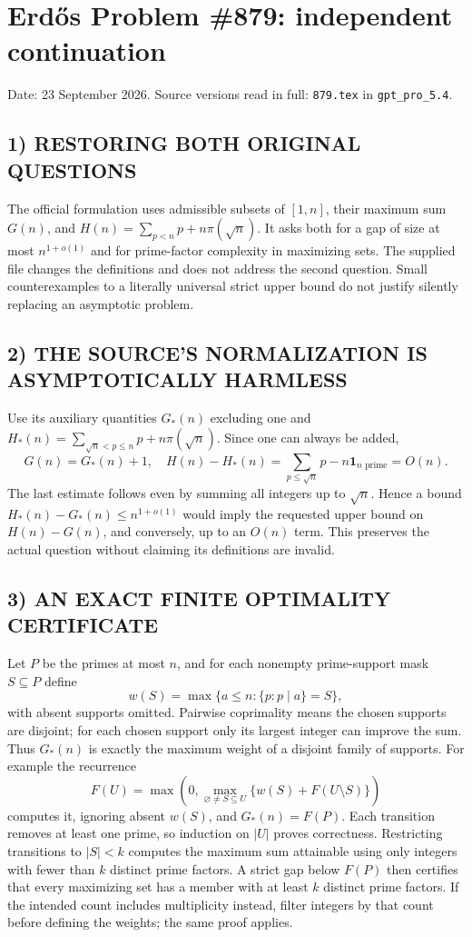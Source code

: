 \section{Erd\H{o}s Problem \#879: independent continuation}
\noindent Date: 23 September 2026. Source versions read in full: \texttt{879.tex} in \texttt{gpt\_pro\_5.4}.

\subsection*{1) RESTORING BOTH ORIGINAL QUESTIONS}
The official formulation uses admissible subsets of $[1,n]$, their maximum sum $G(n)$, and $H(n)=\sum_{p<n}p+n\pi(\sqrt n)$. It asks both for a gap of size at most $n^{1+o(1)}$ and for prime-factor complexity in maximizing sets. The supplied file changes the definitions and does not address the second question. Small counterexamples to a literally universal strict upper bound do not justify silently replacing an asymptotic problem.
\subsection*{2) THE SOURCE'S NORMALIZATION IS ASYMPTOTICALLY HARMLESS}
Use its auxiliary quantities $G_*(n)$ excluding one and $H_*(n)=\sum_{\sqrt n<p\le n}p+n\pi(\sqrt n)$. Since one can always be added,
\[
G(n)=G_*(n)+1,
\quad H(n)-H_*(n)=\sum_{p\le\sqrt n}p-n\mathbf1_{n\text{ prime}}=O(n).
\]
The last estimate follows even by summing all integers up to $\sqrt n$. Hence a bound $H_*(n)-G_*(n)\le n^{1+o(1)}$ would imply the requested upper bound on $H(n)-G(n)$, and conversely, up to an $O(n)$ term. This preserves the actual question without claiming its definitions are invalid.
\subsection*{3) AN EXACT FINITE OPTIMALITY CERTIFICATE}
Let $P$ be the primes at most $n$, and for each nonempty prime-support mask $S\subseteq P$ define
\[
w(S)=\max\{a\le n:\{p:p\mid a\}=S\},
\]
with absent supports omitted. Pairwise coprimality means the chosen supports are disjoint; for each chosen support only its largest integer can improve the sum. Thus $G_*(n)$ is exactly the maximum weight of a disjoint family of supports. For example the recurrence
\[
F(U)=\max\left(0,\max_{\varnothing\ne S\subseteq U}\{w(S)+F(U\setminus S)\}\right)
\]
computes it, ignoring absent $w(S)$, and $G_*(n)=F(P)$. Each transition removes at least one prime, so induction on $|U|$ proves correctness.
Restricting transitions to $|S|<k$ computes the maximum sum attainable using only integers with fewer than $k$ distinct prime factors. A strict gap below $F(P)$ then certifies that every maximizing set has a member with at least $k$ distinct prime factors. If the intended count includes multiplicity instead, filter integers by that count before defining the weights; the same proof applies.
